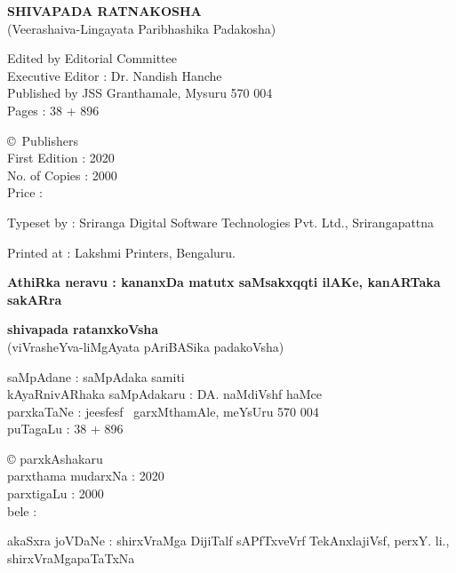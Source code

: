 \thispagestyle{empty}
\noindent
{\rm\sf\bfseries SHIVAPADA RATNAKOSHA}\\[5pt]
{\rm (Veerashaiva-Lingayata Paribhashika Padakosha)} 

\noindent
{\rm Edited by Editorial Committee}\\
{\rm Executive Editor : Dr. Nandish Hanche}\\
{\rm Published by JSS Granthamale, Mysuru 570 004}\\[8pt]
{\rm Pages : 38 + 896}

\vspace{1cm}

\noindent
{\rm \copyright \ Publishers}\\[7pt]
{\rm First Edition : 2020}\\[7pt]
{\rm No. of Copies : 2000}\\[7pt]
{\rm Price :} \rupee

\bigskip

\noindent
{\rm Typeset by : Sriranga Digital Software Technologies Pvt. Ltd., Srirangapattna}

\medskip

\noindent
{\rm Printed at : Lakshmi Printers, Bengaluru.}

\vfill

\noindent
{\bf AthiRka neravu : kananxDa matutx saMsakxqqti ilAKe, kanARTaka sakARra}

\vskip 1cm

\noindent
{\bf\large shivapada ratanxkoVsha}\\[5pt]
(viVrasheYva-liMgAyata pAriBASika padakoVsha) 

\smallskip

\noindent
saMpAdane : saMpAdaka samiti\\
kAyaRnivARhaka saMpAdakaru : DA. naMdiVshf haMce\\
parxkaTaNe : je{esf}{esf} \ garxMthamAle, meYsUru 570 004\\[8pt]
puTagaLu : 38 + 896

\vspace{1cm}

\noindent
{\rm \copyright} parxkAshakaru\\[7pt]
parxthama mudarxNa : 2020\\[7pt]
parxtigaLu : 2000\\[10pt]
bele : \rupee

\bigskip

\noindent
akaSxra joVDaNe : shirxVraMga DijiTalf sAPfTxveVrf TekAnxlajiVsf, perxY. li., shirxVraMgapaTaTxNa

